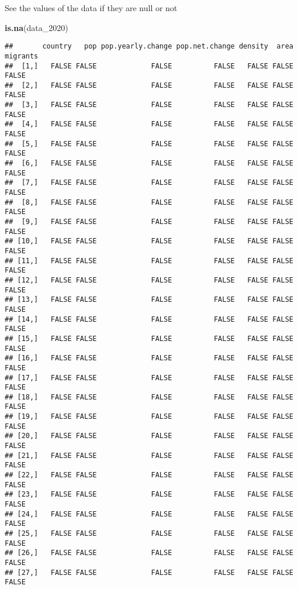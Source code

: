 \documentclass[
]{article}
\newenvironment{Shaded}{\begin{snugshade}}{\end{snugshade}}
\newcommand{\FunctionTok}[1]{\textcolor[rgb]{0.13,0.29,0.53}{\textbf{#1}}}
\newcommand{\NormalTok}[1]{#1}
\begin{document}
See the values of the data if they are null or not

\begin{Shaded}
\begin{Highlighting}[]
\FunctionTok{is.na}\NormalTok{(data\_2020)}
\end{Highlighting}
\end{Shaded}

\begin{verbatim}
##       country   pop pop.yearly.change pop.net.change density  area migrants
##  [1,]   FALSE FALSE             FALSE          FALSE   FALSE FALSE    FALSE
##  [2,]   FALSE FALSE             FALSE          FALSE   FALSE FALSE    FALSE
##  [3,]   FALSE FALSE             FALSE          FALSE   FALSE FALSE    FALSE
##  [4,]   FALSE FALSE             FALSE          FALSE   FALSE FALSE    FALSE
##  [5,]   FALSE FALSE             FALSE          FALSE   FALSE FALSE    FALSE
##  [6,]   FALSE FALSE             FALSE          FALSE   FALSE FALSE    FALSE
##  [7,]   FALSE FALSE             FALSE          FALSE   FALSE FALSE    FALSE
##  [8,]   FALSE FALSE             FALSE          FALSE   FALSE FALSE    FALSE
##  [9,]   FALSE FALSE             FALSE          FALSE   FALSE FALSE    FALSE
## [10,]   FALSE FALSE             FALSE          FALSE   FALSE FALSE    FALSE
## [11,]   FALSE FALSE             FALSE          FALSE   FALSE FALSE    FALSE
## [12,]   FALSE FALSE             FALSE          FALSE   FALSE FALSE    FALSE
## [13,]   FALSE FALSE             FALSE          FALSE   FALSE FALSE    FALSE
## [14,]   FALSE FALSE             FALSE          FALSE   FALSE FALSE    FALSE
## [15,]   FALSE FALSE             FALSE          FALSE   FALSE FALSE    FALSE
## [16,]   FALSE FALSE             FALSE          FALSE   FALSE FALSE    FALSE
## [17,]   FALSE FALSE             FALSE          FALSE   FALSE FALSE    FALSE
## [18,]   FALSE FALSE             FALSE          FALSE   FALSE FALSE    FALSE
## [19,]   FALSE FALSE             FALSE          FALSE   FALSE FALSE    FALSE
## [20,]   FALSE FALSE             FALSE          FALSE   FALSE FALSE    FALSE
## [21,]   FALSE FALSE             FALSE          FALSE   FALSE FALSE    FALSE
## [22,]   FALSE FALSE             FALSE          FALSE   FALSE FALSE    FALSE
## [23,]   FALSE FALSE             FALSE          FALSE   FALSE FALSE    FALSE
## [24,]   FALSE FALSE             FALSE          FALSE   FALSE FALSE    FALSE
## [25,]   FALSE FALSE             FALSE          FALSE   FALSE FALSE    FALSE
## [26,]   FALSE FALSE             FALSE          FALSE   FALSE FALSE    FALSE
## [27,]   FALSE FALSE             FALSE          FALSE   FALSE FALSE    FALSE

\end{verbatim}
\end{document}
